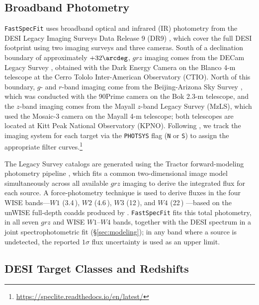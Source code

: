 \documentclass[modern,linenumbers]{aastex701}
\newcommand{\fastspecfit}{\texttt{FastSpecFit}}
\begin{document}
\subsection{Broadband Photometry}
\label{ssec:photometry}

\fastspecfit{} uses broadband optical and infrared (IR) photometry
from the DESI Legacy Imaging Surveys Data Release 9 (DR9)
\citep[hereafter, Legacy Surveys;][]{dey19a}, which cover the full
DESI footprint using two imaging surveys and three cameras. South of a
declination boundary of approximately $+32\arcdeg$, $grz$ imaging
comes from the DECam Legacy Survey \citep[DECaLS;][]{dey19a}, obtained
with the Dark Energy Camera \citep[DECam;][]{flaugher15a} on the
Blanco 4-m telescope at the Cerro Tololo Inter-American Observatory
(CTIO).  North of this boundary, $g$- and $r$-band imaging come from
the Beijing-Arizona Sky Survey \citep[BASS;][]{zou17a}, which was
conducted with the 90Prime camera \citep{williams04a} on the Bok 2.3-m
telescope, and the $z$-band imaging comes from the Mayall $z$-band
Legacy Survey (MzLS), which used the Mosaic-3 camera \citep{dey16a} on
the Mayall 4-m telescope; both telescopes are located at Kitt Peak
National Observatory (KPNO). Following \citet{myers23a}, we track the
imaging system for each target via the \texttt{PHOTSYS} flag
(\texttt{N} or \texttt{S}) to assign the appropriate filter
curves.\footnote{\url{https://speclite.readthedocs.io/en/latest/}}

The Legacy Survey catalogs are generated using the Tractor
forward-modeling photometry pipeline \citep{lang16b, lang16a}, which
fits a common two-dimensional image model simultaneously across all
available $grz$ imaging to derive the integrated flux for each
source. A force-photometry technique is used to derive fluxes in the
four WISE bands---$W1$ (3.4\,\micron), $W2$ (4.6\,\micron), $W3$
(12\,\micron), and $W4$ (22\,\micron) \citep{wright10a}---based on the
unWISE full-depth coadds produced by \citet{lang14a,
  meisner21a}. \fastspecfit{} fits this total photometry, in all seven
$grz$ and WISE $W1$--$W4$ bands, together with the DESI spectrum in a
joint spectrophotometric fit (\S\ref{sec:modeling}); in any band where a
source is undetected, the reported $1\sigma$ flux uncertainty is used
as an upper limit.

\subsection{DESI Target Classes and Redshifts}
\label{ssec:targets}
\end{document}
